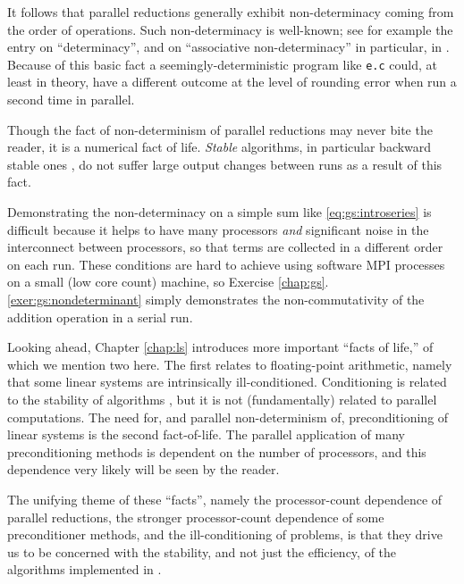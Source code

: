 It follows that parallel reductions generally exhibit non-determinacy coming from the order of operations.  Such non-determinacy is well-known; see for example the entry on ``determinacy'', and on ``associative non-determinacy'' in particular, in \citep{Padua2011}.  Because of this basic fact a seemingly-deterministic program like \texttt{e.c} could, at least in theory, have a different outcome at the level of rounding error when run a second time in parallel.

Though the fact of non-determinism of parallel reductions may never bite the reader, it is a numerical fact of life.  \emph{Stable} algorithms, in particular backward stable ones \citep{TrefethenBau1997}, do not suffer large output changes between runs as a result of this fact.

Demonstrating the non-determinacy on a simple sum like \eqref{eq:gs:introseries} is difficult because it helps to have many processors \emph{and} significant noise in the interconnect between processors, so that terms are collected in a different order on each run.  These conditions are hard to achieve using software MPI processes on a small (low core count) machine, so Exercise \ref{chap:gs}.\ref{exer:gs:nondeterminant} simply demonstrates the non-commutativity of the addition operation in a serial run.

Looking ahead, Chapter \ref{chap:ls} introduces more important ``facts of life,'' of which we mention two here.  The first relates to floating-point arithmetic, namely that some linear systems are intrinsically ill-conditioned.  Conditioning is related to the stability of algorithms \citep{TrefethenBau1997}, but it is not (fundamentally) related to parallel computations.  The need for, and parallel non-determinism of, preconditioning of linear systems is the second fact-of-life.  The parallel application of many preconditioning methods is dependent on the number of processors, and this dependence very likely will be seen by the reader.  

The unifying theme of these ``facts'', namely the processor-count dependence of parallel reductions, the stronger processor-count dependence of some preconditioner methods, and the ill-conditioning of problems, is that they drive us to be concerned with the stability, and not just the efficiency, of the algorithms implemented in \PETSc.


